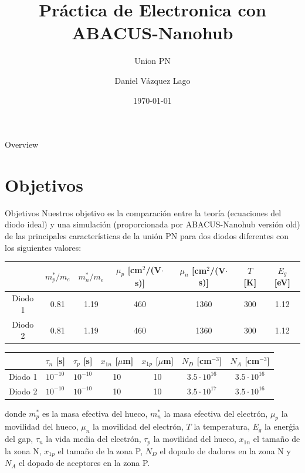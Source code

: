\documentclass[aspectratio=169,xcolor=dvipsnames]{beamer}
\title{Práctica de Electronica con ABACUS-Nanohub}
\subtitle{Union PN}
\author{Daniel Vázquez Lago}
\date{\today} %
\begin{document}
\begin{frame}
    \titlepage
\end{frame}

\begin{frame}{Overview}
    \tableofcontents
\end{frame}

\section{Objetivos}
\begin{frame}{Objetivos}
    Nuestros objetivo es la comparación entre la teoría (ecuaciones del diodo ideal) y una simulación (proporcionada por ABACUS-Nanohub versión old) de las principales características de la unión PN para dos diodos diferentes con los siguientes valores:  

    \begin{table}
        \begin{tabular}{c|cccccc}
            & $m_p^*/m_e$ & $m_n^*/m_e$ & $\mu_p$  \tiny{[cm$^2$/(V$\cdot$s)]} & $\mu_n$ \tiny{[cm$^2$/(V$\cdot$s)]} & $T$ \tiny{[K]} & $E_g$ \tiny{[eV]} \\ \hline
            Diodo 1 & 0.81  & 1.19 & 460 & 1360 & 300 & 1.12  \\
            Diodo 2 & 0.81  & 1.19 & 460 & 1360 & 300 & 1.12  
        \end{tabular}
    \end{table}
    \begin{table}
        \begin{tabular}{c|cccccc}
             &  $\tau_n$ \tiny{[s]} & $\tau_p$ \tiny{[s]} & $x_{1n}$ \tiny{[$\mu$m]} & $x_{1p}$ \tiny{[$\mu$m]} & $N_D$ \tiny{[cm$^{-3}$]} & $N_A$  \tiny{[cm$^{-3}$]}\\ \hline
            Diodo 1  & $10^{-10}$ & $10^{-10}$ & 10 & 10 & $3.5 \cdot 10^{16}$ & $3.5 \cdot 10^{16}$ \\
            Diodo 2  & $10^{-10}$ & $10^{-10}$ & 10 & 10 & $3.5 \cdot 10^{17}$ & $3.5 \cdot 10^{16}$ 
        \end{tabular}
    \end{table}
    donde $m_p^*$ es la masa efectiva del hueco, $m_n^*$ la masa efectiva del electrón, $\mu_p$ la movilidad del hueco, $\mu_n$ la movilidad del electrón, $T$ la temperatura, $E_g$ la enerǵia del gap, $\tau_n$ la vida media del electrón, $\tau_p$ la movilidad del hueco, $x_{1n}$ el tamaño de la zona N, $x_{1p}$ el tamaño de la zona P, $N_D$ el dopado de dadores en la zona N y $N_A$ el dopado de aceptores en la zona P.
\end{frame}
\end{document}
